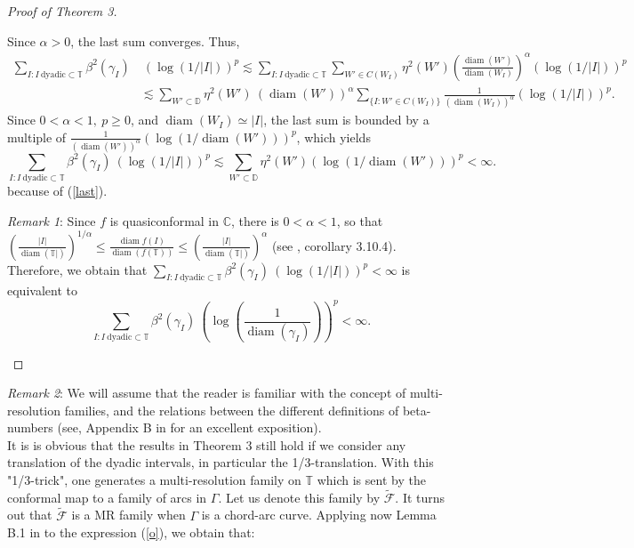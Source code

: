 \documentclass[12pt,a4paper]{article}
\theoremstyle{definition}
\theoremstyle{remark}
\newcommand{\C}{\mathbb{C}}
\newcommand{\D}{\mathbb{D}}
\newcommand{\T}{\mathbb{T}}
\newcommand{\diam}{\operatorname{diam}}
\numberwithin{komcounter}{section}
\begin{document}
\begin{proof}[Proof of Theorem 3]
\begin{itemize}
$$$$ 
Since $\alpha>0$, the last sum converges.
Thus, 
\begin{align}\nonumber
\sum_{ I: I~\textrm{dyadic}  \subset  \T} \beta^2 (\gamma_ I)&~(\log (1/|I|))^p\lesssim \sum_{ I: I~\textrm{dyadic}  \subset  \T} 
\sum_{W'\in C(W_I)} \eta^2(W') \left(\frac{\diam(W')}{\diam (W_I)}\right)^\alpha (\log (1/|I|))^p\\\nonumber
&\lesssim 
\sum_{W'\subset \D}\eta^2 (W') ~(\diam (W'))^\alpha \sum_{\{I: W'\in C(W_I)\}}\frac{1}{ (\diam (W_I))^{\alpha} }  (\log (1/|I|))^p. 
\end{align}
Since $0<\alpha<1, ~p\geq 0$, and $\diam (W_I)\simeq |I|$, the last sum is  bounded by a multiple of $\frac{1}{ (\diam (W'))^{\alpha} }  (\log (1/\diam (W')))^p $, which yields
$$
\sum_{ I: I~\textrm{dyadic}  \subset  \T} \beta^2 (\gamma_ I)~(\log (1/|I|))^p\lesssim
\sum_{W'\subset \D}\eta^2 (W') (\log (1/\diam (W')))^p<\infty.$$
because of (\ref{last}).

\textit{Remark 1}:
Since $f$ is quasiconformal in $\C$, there is  $0<\alpha<1$, so that $\left(\frac{|I|}{\diam(\T|)}\right)^{1/\alpha}\leq \frac{\diam{f(I)}}{\diam (f(\T))}\leq \left(\frac{|I|}{\diam(\T|)}\right)^{\alpha}$ (see \cite{AIM}, corollary 3.10.4).\\
Therefore, we obtain  that $\sum_{ I: I~\textrm{dyadic}  \subset  \T} \beta^2 (\gamma_ I)~(\log (1/|I|))^p<\infty$ is equivalent to 
\begin{equation}\label{o}
\sum_{ I: I~\textrm{dyadic}  \subset  \T} \beta^2 (\gamma_ I)~\left(\log \left(\frac {1}{\diam(\gamma_I)}\right)\right)^p<\infty.
\end{equation}







\end{itemize}
\end{proof}

\textit{Remark 2}: We will assume that the reader is familiar with the concept of multi-resolution families, and the relations between the different definitions of beta-numbers (see, Appendix B in  \cite{b2} for an excellent exposition).\\
 It is is obvious that the results in Theorem 3 still hold if we consider any translation of the dyadic intervals, in particular the 1/3-translation. With this "1/3-trick", one generates a multi-resolution family  on $\T$ which is sent by the conformal map to a family of arcs in  $\Gamma$. Let us denote this family  by $\mathcal{\tilde{F}}$. It turns out that $\mathcal{\tilde{F}}$ is a MR family when $\Gamma$ is a chord-arc curve. Applying now Lemma B.1 in  \cite{b2} to the expression (\ref{o}), we obtain that:
\end{document}
